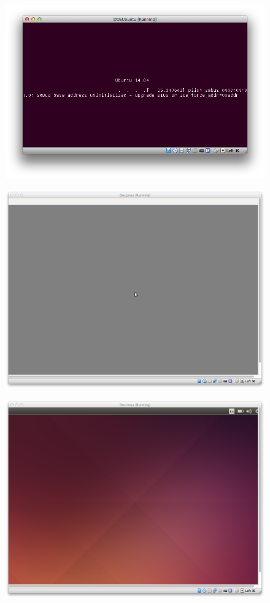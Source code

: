 \documentclass[11pt, a4paper]{article}
\begin{document}
\begin{figure}[H]
	\centering
	\includegraphics[width=\textwidth]{./IMG/E}
\end{figure}

\begin{figure}[H]
	\centering
	\includegraphics[width=\textwidth]{./IMG/F}
\end{figure}

\begin{figure}[H]
	\centering
	\includegraphics[width=\textwidth]{./IMG/G}
\end{figure}
\end{document}
